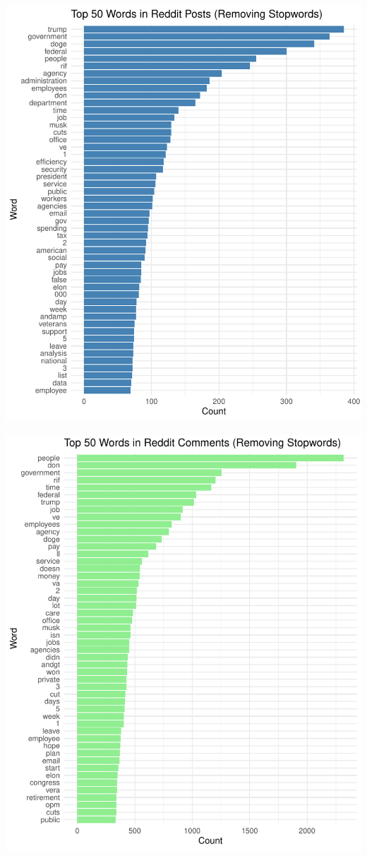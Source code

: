 \documentclass[
  12pt]{article}
\begin{document}
\includegraphics{paper_files/figure-pdf/unnamed-chunk-7-1.pdf}

\includegraphics{paper_files/figure-pdf/unnamed-chunk-7-2.pdf}
\end{document}
